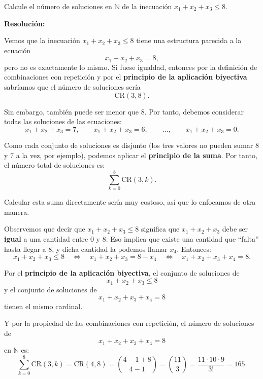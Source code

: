 \documentclass[a4paper,12pt]{article}
\begin{document}
\begin{ejercicio}[title=Ejercicio 32]
Calcule el número de soluciones en $\mathbb{N}$ de la inecuación $x_1 + x_2 + x_3 \le 8$.

\tcblower
\textbf{Resolución:}

Vemos que la inecuación $x_1+x_2+x_3 \le 8$ tiene una estructura parecida a la ecuación
\[
x_1+x_2+x_3 = 8,
\]
pero no es exactamente lo mismo. Si fuese igualdad, entonces por la definición de combinaciones con repetición y por el \textbf{principio de la aplicación biyectiva} sabríamos que el número de soluciones sería
\[
\mathrm{CR}(3,8).
\]

Sin embargo, también puede ser menor que $8$. Por tanto, debemos considerar todas las soluciones de las ecuaciones:
\[
x_1+x_2+x_3 = 7,\qquad
x_1+x_2+x_3 = 6,\qquad \dots,\qquad
x_1+x_2+x_3 = 0.
\]

Como cada conjunto de soluciones es disjunto (los tres valores no pueden sumar $8$ y $7$ a la vez, por ejemplo), podemos aplicar el \textbf{principio de la suma}. Por tanto, el número total de soluciones es:
\[
\sum_{k=0}^{8} \mathrm{CR}(3,k).
\]

Calcular esta suma directamente sería muy costoso, así que lo enfocamos de otra manera.

\medskip

Observemos que decir que $x_1+x_2+x_3 \le 8$ significa que $x_1+x_2+x_3$ debe ser \textbf{igual} a una cantidad entre $0$ y $8$. Eso implica que existe una cantidad que “falta” hasta llegar a $8$, y dicha cantidad la podemos llamar $x_4$. Entonces:
\[
x_1+x_2+x_3 \le 8 
\quad\Longleftrightarrow\quad
x_1+x_2+x_3 = 8 - x_4
\quad\Longleftrightarrow\quad
x_1+x_2+x_3+x_4 = 8.
\]

Por el \textbf{principio de la aplicación biyectiva}, el conjunto de soluciones de  
\[
x_1+x_2+x_3\le 8
\]
y el conjunto de soluciones de  
\[
x_1+x_2+x_3+x_4 = 8
\]
tienen el mismo cardinal.

Y por la propiedad de las combinaciones con repetición, el número de soluciones de  
\[
x_1+x_2+x_3+x_4 = 8
\]
en $\mathbb{N}$ es:
\[
\sum_{k=0}^{8} \mathrm{CR}(3,k) =
\mathrm{CR}(4,8)
= \binom{4-1+8}{4-1}
= \binom{11}{3}
= \frac{11\cdot 10\cdot 9}{3!}
= \boxed{165}.
\]

\end{ejercicio}
\end{document}
